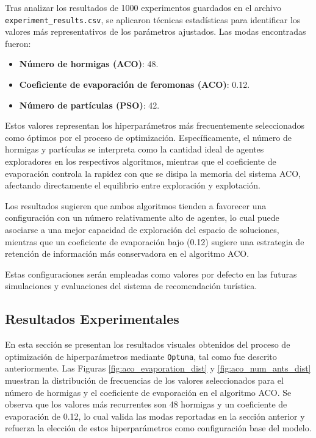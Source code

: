 \documentclass[runningheads]{llncs}
\begin{document}
Tras analizar los resultados de 1000 experimentos guardados en el archivo \texttt{experiment\_results.csv}, se aplicaron técnicas estadísticas para identificar los valores más representativos de los parámetros ajustados. Las modas encontradas fueron:

\begin{itemize}
    \item \textbf{Número de hormigas (ACO)}: 48.
    \item \textbf{Coeficiente de evaporación de feromonas (ACO)}: 0.12.
    \item \textbf{Número de partículas (PSO)}: 42.
\end{itemize}

Estos valores representan los hiperparámetros más frecuentemente seleccionados como óptimos por el proceso de optimización. Específicamente, el número de hormigas y partículas se interpreta como la cantidad ideal de agentes exploradores en los respectivos algoritmos, mientras que el coeficiente de evaporación controla la rapidez con que se disipa la memoria del sistema ACO, afectando directamente el equilibrio entre exploración y explotación.

Los resultados sugieren que ambos algoritmos tienden a favorecer una configuración con un número relativamente alto de agentes, lo cual puede asociarse a una mejor capacidad de exploración del espacio de soluciones, mientras que un coeficiente de evaporación bajo (0.12) sugiere una estrategia de retención de información más conservadora en el algoritmo ACO.

Estas configuraciones serán empleadas como valores por defecto en las futuras simulaciones y evaluaciones del sistema de recomendación turística.


\subsection{Resultados Experimentales}

En esta sección se presentan los resultados visuales obtenidos del proceso de optimización de hiperparámetros mediante \texttt{Optuna}, tal como fue descrito anteriormente. Las Figuras \ref{fig:aco_evaporation_dist} y \ref{fig:aco_num_ants_dist} muestran la distribución de frecuencias de los valores seleccionados para el número de hormigas y el coeficiente de evaporación en el algoritmo ACO. Se observa que los valores más recurrentes son 48 hormigas y un coeficiente de evaporación de 0.12, lo cual valida las modas reportadas en la sección anterior y refuerza la elección de estos hiperparámetros como configuración base del modelo.
\end{document}
